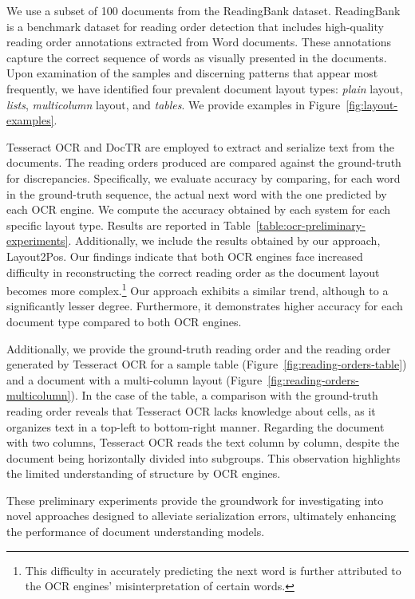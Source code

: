 We use a subset of 100 documents from the ReadingBank \citep{wang2021layoutreader} dataset. ReadingBank is a benchmark dataset for reading order detection that includes high-quality reading order annotations extracted from Word documents. These annotations capture the correct sequence of words as visually presented in the documents. Upon examination of the samples and discerning patterns that appear most frequently, we have identified four prevalent document layout types: \textit{plain} layout, \textit{lists}, \textit{multicolumn} layout, and \textit{tables}. We provide examples in Figure~\ref{fig:layout-examples}. 

Tesseract OCR and DocTR are employed to extract and serialize text from the documents. The reading orders produced are compared against the ground-truth for discrepancies. Specifically, we evaluate accuracy by comparing, for each word in the ground-truth sequence, the actual next word with the one predicted by each \ac{OCR} engine. We compute the accuracy obtained by each system for each specific layout type. Results are reported in Table~\ref{table:ocr-preliminary-experiments}. Additionally, we include the results obtained by our approach, Layout2Pos. Our findings indicate that both \ac{OCR} engines face increased difficulty in reconstructing the correct reading order as the document layout becomes more complex.\footnote{This difficulty in accurately predicting the next word is further attributed to the \ac{OCR} engines' misinterpretation of certain words.} Our approach exhibits a similar trend, although to a significantly lesser degree. Furthermore, it demonstrates higher accuracy for each document type compared to both \ac{OCR} engines.

Additionally, we provide the ground-truth reading order and the reading order generated by Tesseract OCR for a sample table (Figure~\ref{fig:reading-orders-table}) and a document with a multi-column layout (Figure~\ref{fig:reading-orders-multicolumn}). In the case of the table, a comparison with the ground-truth reading order reveals that Tesseract OCR lacks knowledge about cells, as it organizes text in a top-left to bottom-right manner. Regarding the document with two columns, Tesseract OCR reads the text column by column, despite the document being horizontally divided into subgroups. This observation highlights the limited understanding of structure by \ac{OCR} engines. 

These preliminary experiments provide the groundwork for investigating into novel approaches designed to alleviate serialization errors, ultimately enhancing the performance of document understanding models.


